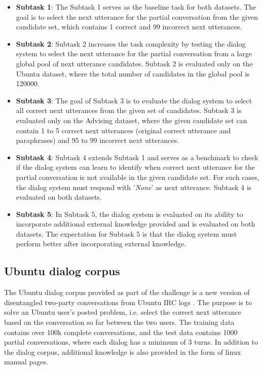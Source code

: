 \documentclass[letterpaper]{article} %
\begin{document}
\begin{itemize}
    \item \textbf{Subtask 1}: The Subtask 1 serves as the baseline task for both datasets. The goal is to select the next utterance for the partial conversation from the given candidate set, which contains 1 correct and 99 incorrect next utterances.

    \item \textbf{Subtask 2}: Subtask 2 increases the task complexity by testing the dialog system to select the next utterance for the partial conversation from a large global pool of next utterance candidates. Subtask 2 is evaluated only on the Ubuntu dataset, where the total number of candidates in the global pool is 120000.

    \item \textbf{Subtask 3}: The goal of Subtask 3 is to evaluate the dialog system to select all correct next utterances from the given set of candidates. Subtask 3 is evaluated only on the Advising dataset, where the given candidate set can contain 1 to 5 correct next utterances (original correct utterance and paraphrases) and 95 to 99 incorrect next utterances.

    \item \textbf{Subtask 4}: Subtask 4 extends Subtask 1 and serves as a benchmark to check if the dialog system can learn to identify when correct next utterance for the partial conversation is not available in the given candidate set. For such cases, the dialog system must respond with '\textit{None}' as next utterance. Subtask 4 is evaluated on both datasets.

    \item \textbf{Subtask 5}: In Subtask 5, the dialog system is evaluated on its ability to incorporate additional external knowledge provided and is evaluated on both datasets. The expectation for Subtask 5 is that the dialog system must perform better after incorporating external knowledge.
\end{itemize}

\subsection{Ubuntu dialog corpus}
\label{Ubuntu-dialog-corpus}
The Ubuntu dialog corpus provided as part of the challenge is a new version of disentangled two-party conversations from Ubuntu IRC logs \cite{kummerfeld2018analyzing}. The purpose is to solve an Ubuntu user's posted problem, i.e. select the correct next utterance based on the conversation so far between the two users. The training data contains over 100k complete conversations, and the test data contains 1000 partial conversations, where each dialog has a minimum of 3 turns. In addition to the dialog corpus, additional knowledge is also provided in the form of linux manual pages.
\end{document}
